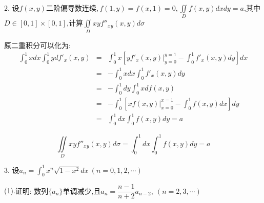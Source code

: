 
2. 设$f(x,y)\text{二阶偏导数连续},f(1,y)=f(x,1)=0,\iint\limits_{D}f(x,y)dxdy=a$,其中$D\in [0,1]\times [0,1]$,计算$\iint\limits_{D}xyf''_{xy}(x,y)d\sigma$
\begin{solution}
	
	原二重积分可以化为: 
	\begin{eqnarray*}
		\int_{0}^{1}xdx\int_{0}^{1}ydf'_{x}(x,y)&=&\int_{0}^{1}x\left[yf'_{x}(x,y)|_{y=0}^{y=1}-\int_{0}^{1}f'_{x}(x,y)dy\right]dx\\
		&=&-\int_{0}^{1}xdx\int_{0}^{1}f'_{x}(x,y)dy\\
		&=&-\int_{0}^{1}dy\int_{0}^{1}xdf(x,y)\\
		&=&-\int_{0}^{1}\left[xf(x,y)|_{x=0}^{x=1}-\int_{0}^{1}f(x,y)dx\right]dy\\
		&=&\int_{0}^{1}dx\int_{0}^{1}f(x,y)dy=a
	\end{eqnarray*}
	
	$$\iint\limits_{D}xyf''_{xy}(x,y)d\sigma=\int_{0}^{1}dx\int_{0}^{1}f(x,y)dy=a$$
\end{solution}


3. 设$a_{n}=\int_{0}^{1}x^{n}\sqrt{1-x^2}dx\ (n=0,1,2,\cdots)$

(1).$\text{证明: 数列}\{a_{n}\}\text{单调减少,且}a_{n}=\dfrac{n-1}{n+2}a_{n-2},\ (n=2,3,\cdots)$

